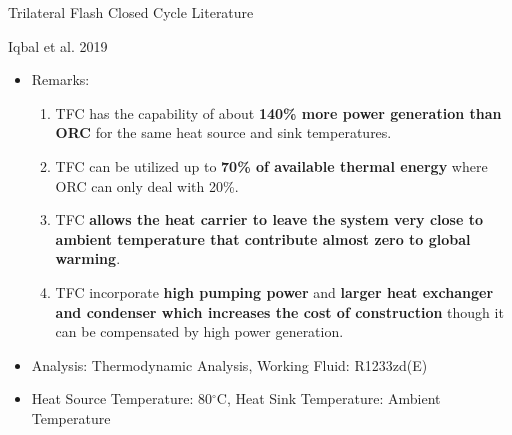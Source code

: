 \begin{frame}{Trilateral Flash Closed Cycle Literature}
    \begin{block}{Iqbal et al. 2019 \cite{iqbal2019trilateral}}
     \begin{itemize}
         \item Remarks: 
         \begin{enumerate}
             \item TFC has the capability of about \textbf{140\% more power generation than ORC} for the same heat source and sink temperatures.
             \item TFC can be utilized up to \textbf{70\% of available thermal energy} where ORC can only deal with 20\%.
             \item TFC \textbf{allows the heat carrier to leave the system very close to ambient temperature that contribute almost zero to global warming}.
             \item TFC incorporate \textbf{high pumping power} and \textbf{larger heat exchanger and condenser which increases the cost of construction} though it can be compensated by high power generation.
         \end{enumerate}
         \item Analysis: Thermodynamic Analysis, Working Fluid: R1233zd(E)
         \item Heat Source Temperature: 80$^\circ$C, Heat Sink Temperature: Ambient Temperature
     \end{itemize}
    \end{block}
\end{frame}

